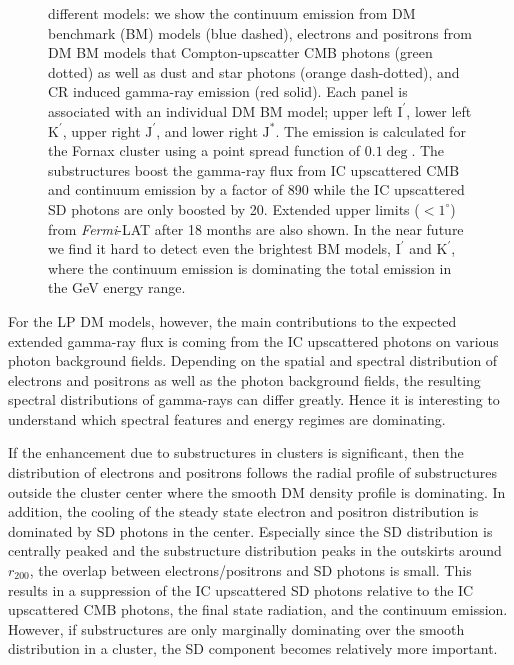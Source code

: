 \documentclass[10pt,aps,pra,reprint,amsmath,amsfonts,amssymb,showpacs,nofootinbib,floatfix]{revtex4-1}
\newcommand{\Fermi}{{\em Fermi}\xspace}
\newcommand{\rmn}{\mathrm}
\newcommand{\Kp}{\rmn{K}^\prime}
\newcommand{\Ip}{\rmn{I}^\prime}
\newcommand{\Js}{\rmn{J}^*}
\newcommand{\Jp}{\rmn{J}^\prime}
\newcommand{\rvir}{r_{200}}
\begin{document}
\begin{figure}
\begin{minipage}{2.0\columnwidth}
{  different models: we show the continuum emission from DM benchmark
  (BM) models (blue dashed), electrons and positrons from DM BM models
  that Compton-upscatter CMB photons (green dotted) as well as dust
  and star photons (orange dash-dotted), and CR induced gamma-ray
  emission (red solid). Each panel is associated with an individual DM
  BM model; upper left $\Ip$, lower left $\Kp$, upper right $\Jp$, and
  lower right $\Js$. The emission is calculated for the Fornax cluster
  using a point spread function of $0.1\deg$. The substructures boost
  the gamma-ray flux from IC upscattered CMB and continuum emission by
  a factor of 890 while the IC upscattered SD photons are only boosted
  by 20. Extended upper limits ($<1^\circ$) from \Fermi-LAT after 18
  months \protect \cite{2010ApJ...717L..71A} are also shown. In the
  near future we find it hard to detect even the brightest BM models,
  $\Ip$ and $\Kp$, where the continuum emission is dominating the
  total emission in the GeV energy range.}
 \label{fig:diff_BM}
\end{minipage}
\end{figure}

For the LP DM models, however, the main contributions
to the expected extended gamma-ray flux is coming from the IC
upscattered photons on various photon background fields. Depending on
the spatial and spectral distribution of electrons and positrons as
well as the photon background fields, the resulting spectral
distributions of gamma-rays can differ greatly. Hence it is interesting
to understand which spectral features and energy regimes are
dominating.

If the enhancement due to substructures in clusters is significant,
then the distribution of electrons and positrons follows the radial
profile of substructures outside the cluster center where the smooth
DM density profile is dominating. In addition, the cooling of the
steady state electron and positron distribution is dominated by SD
photons in the center. Especially since the SD distribution is
centrally peaked and the substructure distribution peaks in the
outskirts around $\rvir$, the overlap between electrons/positrons and
SD photons is small. This results in a suppression of the IC
upscattered SD photons relative to the IC upscattered CMB photons, the
final state radiation, and the continuum emission. However, if
substructures are only marginally dominating over the smooth
distribution in a cluster, the SD component becomes relatively more
important.
\end{document}
